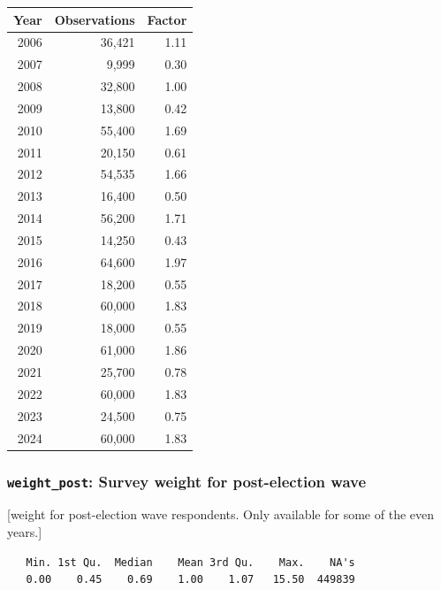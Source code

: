 \documentclass[10pt,article,oneside]{memoir}
\begin{document}
\begin{center}

\begin{table}[H]
\centering
\begin{tabular}[t]{rrr}
\toprule
Year & Observations & Factor\\
\midrule
2006 & 36,421 & 1.11\\
2007 & 9,999 & 0.30\\
2008 & 32,800 & 1.00\\
2009 & 13,800 & 0.42\\
2010 & 55,400 & 1.69\\
2011 & 20,150 & 0.61\\
2012 & 54,535 & 1.66\\
2013 & 16,400 & 0.50\\
2014 & 56,200 & 1.71\\
2015 & 14,250 & 0.43\\
2016 & 64,600 & 1.97\\
2017 & 18,200 & 0.55\\
2018 & 60,000 & 1.83\\
2019 & 18,000 & 0.55\\
2020 & 61,000 & 1.86\\
2021 & 25,700 & 0.78\\
2022 & 60,000 & 1.83\\
2023 & 24,500 & 0.75\\
2024 & 60,000 & 1.83\\
\bottomrule
\end{tabular}
\end{table}
\end{center}

\subsubsection{\texorpdfstring{\texttt{weight\_post}: Survey weight for
post-election
wave}{weight\_post: Survey weight for post-election wave}}\label{weight_post-survey-weight-for-post-election-wave}

{[}weight for post-election wave respondents. Only available for some of
the even years.{]}

\begin{verbatim}
   Min. 1st Qu.  Median    Mean 3rd Qu.    Max.    NA's 
   0.00    0.45    0.69    1.00    1.07   15.50  449839 
\end{verbatim}
\end{document}

